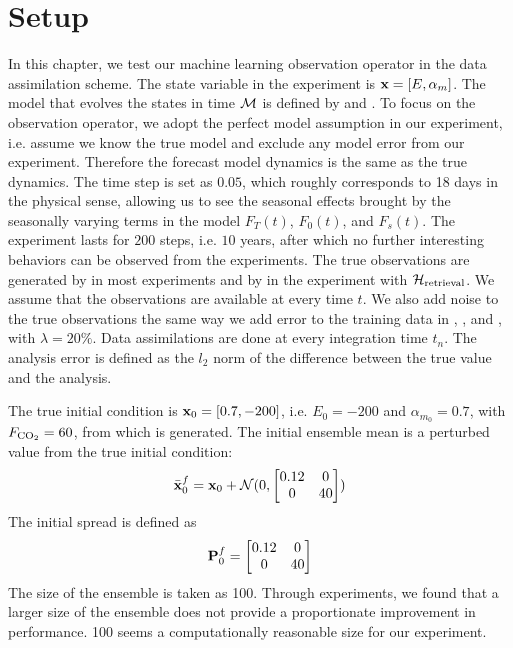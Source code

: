 \section{Setup}\label{sec:expsetup}
\par In this chapter, we test our machine learning observation operator in the data assimilation scheme. The state variable in the experiment is $\textbf{x}=[E,\alpha_m]$. The model that evolves the states in time $\mathcal{M}$ is defined by  and . To focus on the observation operator, we adopt the perfect model assumption in our experiment, i.e. assume we know the true model and exclude any model error from our experiment. Therefore the forecast model dynamics is the same as the true dynamics. The time step is set as $0.05$, which roughly corresponds to 18 days in the physical sense, allowing us to see the seasonal effects brought by the seasonally varying terms in the model $F_T(t)$, $F_0(t)$, and $F_s(t)$. The experiment lasts for $200$ steps, i.e. $10$ years, after which no further interesting behaviors can be observed from the experiments. The true observations are generated by  in most experiments and by  in the experiment with $\mathcal{H}_{\text{retrieval}}$. We assume that the observations are available at every time $t$. We also add noise to the true observations the same way we add error to the training data in , , and , with $\lambda=20\%$. Data assimilations are done at every integration time $t_n$. The analysis error is defined as the $l_2$ norm of the difference between the true value and the analysis.
\par The true initial condition is $\textbf{x}_0=[0.7,-200]$, i.e. $E_0=-200$ and $\alpha_{m_0}=0.7$, with $F_{\text{CO}_2}=60$, from which  is generated. The initial ensemble mean is a perturbed value from the true initial condition:
\[\bar{\textbf{x}}^f_0 = \textbf{x}_0+\mathcal{N}(0,\begin{bmatrix}
    0.12 & 0 \\
    0 & 40
    \end{bmatrix})
\]
The initial spread is defined as 
\[\textbf{P}^f_0 = \begin{bmatrix}
    0.12 & 0 \\
    0 & 40
    \end{bmatrix}
\]
The size of the ensemble is taken as 100. Through experiments, we found that a larger size of the ensemble does not provide a proportionate improvement in performance. 100 seems a computationally reasonable size for our experiment.

